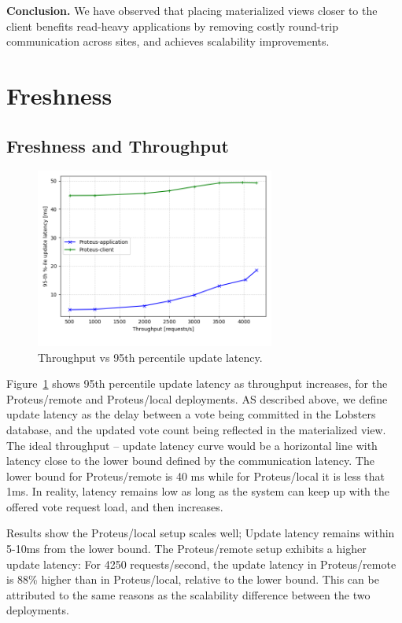 \medskip
\noindent
\textbf{Conclusion.} We have observed that placing materialized views closer to the client benefits read-heavy applications
by removing costly round-trip communication across sites, and achieves scalability improvements.


\section{Freshness}
\label{sec:eval_freshness}

\subsection{Freshness and Throughput}
\label{sec:eval_freshness_throughput}

\begin{figure}[H]
\centering
  \includegraphics[width=0.7\textwidth]{./figures/evaluation/fr_latency_throughput.png}
  \caption{Throughput vs 95th percentile update latency.}
  \label{fig:fr_latency_throughput}
\end{figure}

Figure~\ref{fig:fr_latency_throughput} shows 95th percentile update latency as throughput increases,
for the Proteus/remote and Proteus/local deployments.
AS described above, we define update latency as the delay between a vote being committed in the
Lobsters database, and the updated vote count being reflected in the materialized view.
The ideal throughput -- update latency curve would be a horizontal line with latency close to the lower bound defined by
the communication latency.
The lower bound for Proteus/remote is 40 ms while for Proteus/local it is less that 1ms.
In reality, latency remains low as long as the system can keep up with the offered vote request load,
and then increases.

Results show the Proteus/local setup scales well; Update latency remains within 5-10ms from the lower bound.
The Proteus/remote setup exhibits a higher update latency:
For 4250 requests/second, the update latency in Proteus/remote is 88\% higher than in Proteus/local,
relative to the lower bound.
This can be attributed to the same reasons as the scalability difference between the two deployments.

